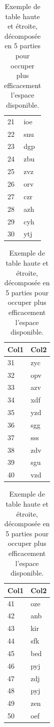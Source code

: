 \documentclass{ASD}
\begin{document}
\begin{table}[htb]
\begin{minipage}[t]{0.19\linewidth}
\begin{tabular}{l l}
			21 & ioe \\
			22 & snu \\
			23 & dgp \\
			24 & zbu \\
			25 & zvz \\
			26 & orv \\
			27 & czr \\
			28 & azh \\
			29 & cyh \\
			30 & ytj \\
			\hline
		\end{tabular}
	\end{minipage}
	\begin{minipage}[t]{0.19\linewidth}
		\centering
		\begin{tabular}{l l}
			\hline
			\rowcolor{DarkColor} 
			\textbf{Col1} 			& \textbf{Col2} \\ 
			\hline
			31 & zyc \\
			32 & opv \\
			33 & azv \\
			34 & xdf \\
			35 & yzd \\
			36 & sgg \\
			37 & sss \\
			38 & zdv \\
			39 & sgu \\
			40 & vzd \\
			\hline
		\end{tabular}
	\end{minipage}
	\begin{minipage}[t]{0.19\linewidth}
		\centering
		\begin{tabular}{l l}
			\hline
			\rowcolor{DarkColor} 
			\textbf{Col1} 			& \textbf{Col2} \\ 
			\hline
			41 & oze \\
			42 & anb \\
			43 & kir \\
			44 & sfk \\
			45 & bed \\
			46 & pyj \\
			47 & zdj \\
			48 & pyj \\
			49 & zen \\
			50 & oef \\
			\hline
		\end{tabular}
	\end{minipage}
	\caption{Exemple de table haute et étroite, décomposée en 5 parties pour occuper plus efficacement l'espace disponible.}
	\label{tab:etroit}
\end{table}
\end{document}

